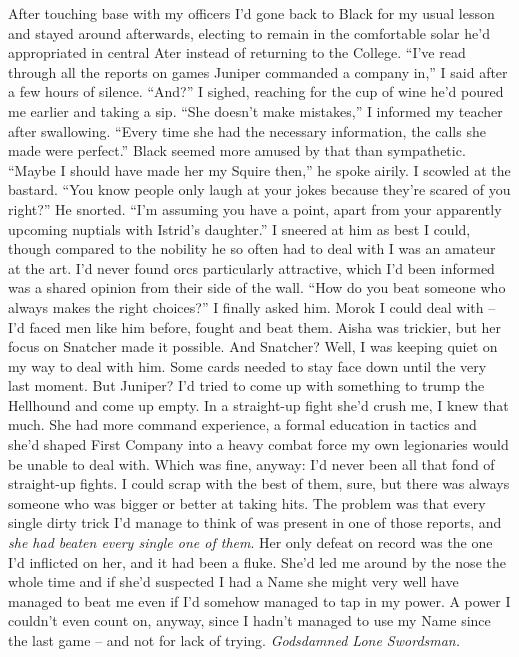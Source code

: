 \documentclass[12pt, openany]{book}
\begin{document}
After touching base with my officers I’d gone back to Black for my usual lesson and stayed around afterwards, electing to remain in the comfortable solar he’d appropriated in central Ater instead of returning to the College.
“I’ve read through all the reports on games Juniper commanded a company in,” I said after a few hours of silence.
“And?”
I sighed, reaching for the cup of wine he’d poured me earlier and taking a sip.
“She doesn’t make mistakes,” I informed my teacher after swallowing. “Every time she had the necessary information, the calls she made were perfect.”
Black seemed more amused by that than sympathetic.
“Maybe I should have made her my Squire then,” he spoke airily.
I scowled at the bastard.
“You know people only laugh at your jokes because they’re scared of you right?”
He snorted. “I’m assuming you have a point, apart from your apparently upcoming nuptials with Istrid’s daughter.”
I sneered at him as best I could, though compared to the nobility he so often had to deal with I was an amateur at the art. I’d never found orcs particularly attractive, which I’d been informed was a shared opinion from their side of the wall.
“How do you beat someone who always makes the right choices?” I finally asked him.
Morok I could deal with – I’d faced men like him before, fought and beat them. Aisha was trickier, but her focus on Snatcher made it possible. And Snatcher? Well, I was keeping quiet on my way to deal with him. Some cards needed to stay face down until the very last moment. But Juniper? I’d tried to come up with something to trump the Hellhound and come up empty.
In a straight-up fight she’d crush me, I knew that much. She had more command experience, a formal education in tactics and she’d shaped First Company into a heavy combat force my own legionaries would be unable to deal with. Which was fine, anyway: I’d never been all that fond of straight-up fights. I could scrap with the best of them, sure, but there was always someone who was bigger or better at taking hits. The problem was that every single dirty trick I’d manage to think of was present in one of those reports, and \textit{she had beaten every single one of them}.
Her only defeat on record was the one I’d inflicted on her, and it had been a fluke. She’d led me around by the nose the whole time and if she’d suspected I had a Name she might very well have managed to beat me even if I’d somehow managed to tap in my power. A power I couldn’t even count on, anyway, since I hadn’t managed to use my Name since the last game – and not for lack of trying. \textit{Godsdamned Lone Swordsman.}
\end{document}
